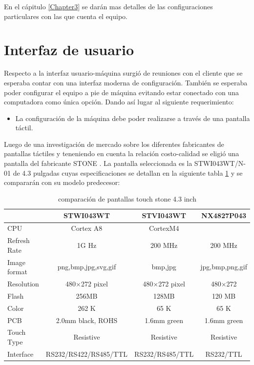 En el cápitulo \ref{Chapter3} se darán mas detalles de las configuraciones particulares con las que cuenta el equipo.

\section{Interfaz de usuario}

Respecto a la interfaz usuario-máquina surgió de reuniones con el cliente que se esperaba contar con una interfaz moderna de configuración. También se esperaba poder configurar el equipo a pie de máquina evitando estar conectado con una computadora como única opción. Dando así lugar al siguiente requerimiento:
\begin{itemize}
\item La configuración de la máquina debe poder realizarse a través de una pantalla táctil.	
\end{itemize} 

Luego de una investigación de mercado sobre los diferentes fabricantes de pantallas táctiles y teneniendo en cuenta la relación costo-calidad se eligió una pantalla del fabricante STONE \citep{web_stone}. La pantalla seleccionada es la STWI043WT/N-01 de 4.3 pulgadas cuyas especificaciones se detallan en la siguiente tabla \ref{tab:tabla_stone} y se compararán con su modelo predecesor:

\clearpage

\begin{table}[ht]
	\centering
	\caption[compatación stone]{comparación de pantallas touch stone 4.3 inch}
	\begin{tabular}{l c c c}    
		\toprule
		\textbf{}     & \textbf{STWI043WT} & \textbf{STVI043WT} & \textbf{NX4827P043} \\
		\midrule
		CPU 			& 	Cortex A8         		& 	CortexM4 			& 					\\		
		Refresh Rate    & 	1G Hz         			& 	200 MHz 			& 	200 MHz			\\
		Image format  	& 	png,bmp,jpg,svg,gif     & 	bmp,jpg 			&   jpg,bmp,png,gif	\\
		Resolution		& 	480×272 pixel	        & 	480×272 pixel 		& 	480×272 		\\
		Flash  			& 	256MB         			& 	128MB 				& 	120 MB 			\\
		Color  			& 	262 K	          		& 	65 K 				& 	65 K  			\\
		PCB 			& 	2.0mm black, ROHS       & 	1.6mm green 		& 	1.6mm green 	\\
		Touch Type		& 	Resistive    			& 	Resistive			& 	Resistive 		\\
		Interface 		& 	RS232/RS422/RS485/TTL   & 	RS232/RS485/TTL		 & 	RS232/TTL 		\\
		\bottomrule
		\hline
	\end{tabular}
	\label{tab:tabla_stone}
\end{table}

